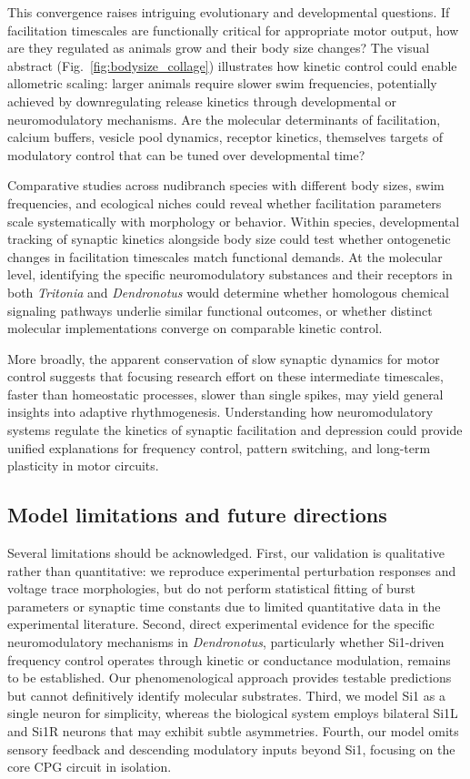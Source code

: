 \documentclass[nofootinbib,aip,amsmath,amssymb,preprint,twocolumn,floatfix,10pt]{revtex4-2}
\begin{document}
This convergence raises intriguing evolutionary and developmental questions. If facilitation timescales are functionally critical for appropriate motor output, how are they regulated as animals grow and their body size changes? The visual abstract (Fig.~\ref{fig:bodysize_collage}) illustrates how kinetic control could enable allometric scaling: larger animals require slower swim frequencies, potentially achieved by downregulating release kinetics through developmental or neuromodulatory mechanisms. Are the molecular determinants of facilitation, calcium buffers, vesicle pool dynamics, receptor kinetics, themselves targets of modulatory control that can be tuned over developmental time?

Comparative studies across nudibranch species with different body sizes, swim frequencies, and ecological niches could reveal whether facilitation parameters scale systematically with morphology or behavior. Within species, developmental tracking of synaptic kinetics alongside body size could test whether ontogenetic changes in facilitation timescales match functional demands. At the molecular level, identifying the specific neuromodulatory substances and their receptors in both \textit{Tritonia} and \textit{Dendronotus} would determine whether homologous chemical signaling pathways underlie similar functional outcomes, or whether distinct molecular implementations converge on comparable kinetic control.

More broadly, the apparent conservation of slow synaptic dynamics for motor control suggests that focusing research effort on these intermediate timescales, faster than homeostatic processes, slower than single spikes, may yield general insights into adaptive rhythmogenesis. Understanding how neuromodulatory systems regulate the kinetics of synaptic facilitation and depression could provide unified explanations for frequency control, pattern switching, and long-term plasticity in motor circuits.

\subsection{Model limitations and future directions}

Several limitations should be acknowledged. First, our validation is qualitative rather than quantitative: we reproduce experimental perturbation responses and voltage trace morphologies, but do not perform statistical fitting of burst parameters or synaptic time constants due to limited quantitative data in the experimental literature. Second, direct experimental evidence for the specific neuromodulatory mechanisms in \textit{Dendronotus}, particularly whether Si1-driven frequency control operates through kinetic or conductance modulation, remains to be established. Our phenomenological approach provides testable predictions but cannot definitively identify molecular substrates. Third, we model Si1 as a single neuron for simplicity, whereas the biological system employs bilateral Si1L and Si1R neurons that may exhibit subtle asymmetries. Fourth, our model omits sensory feedback and descending modulatory inputs beyond Si1, focusing on the core CPG circuit in isolation.
\end{document}
